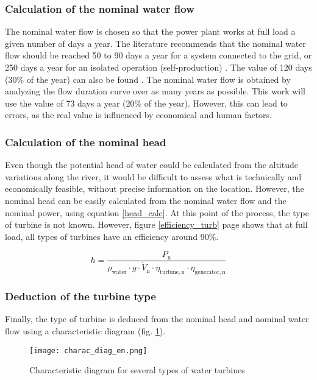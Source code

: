\subsubsection{Calculation of the nominal water flow}
\label{sub:extrapol_dV_n}

The nominal water flow is chosen so that the power plant works at full load a given number of days a year. The literature recommends that the nominal water flow should be reached 50 to 90 days a year for a system connected to the grid, or 250 days a year for an isolated operation (self-production) \cite{pacer}\cite{cetmef}. The value of 120 days (30\% of the year) can also be found \cite{cetmef}. The nominal water flow is obtained by analyzing the flow duration curve over as many years as possible. This work will use the value of 73 days a year (20\% of the year). However, this can lead to errors, as the real value is influenced by economical and human factors.

\subsubsection{Calculation of the nominal head}
\label{sub:extrapol_h_n}

Even though the potential head of water could be calculated from the altitude variations along the river, it would be difficult to assess what is technically and economically feasible, without precise information on the location. However, the nominal head can be easily calculated from the nominal water flow and the nominal power, using equation \ref{head_calc}. At this point of the process, the type of turbine is not known. However, figure \ref{efficiency_turb} page \pageref{efficiency_turb} shows that at full load, all types of turbines have an efficiency around 90\%.

\begin{equation}
\label{head_calc} 
 h = \frac{P_\mathrm{n}}{\rho_\mathrm{water} \cdot g \cdot \dot{V}_\mathrm{n} \cdot \eta_\mathrm{turbine,n} \cdot \eta_\mathrm{generator,n}}
\end{equation}

\subsubsection{Deduction of the turbine type}
Finally, the type of turbine is deduced from the nominal head and nominal water flow using a characteristic diagram (fig. \ref{charac_diag}). 

\begin{figure}[H]
\centering
\texttt{[image: charac\_diag\_en.png]}
\caption[Characteristic diagram for several types of water turbines]{Characteristic diagram for several types of water turbines \cite{wiki_WK}}
\label{charac_diag}
\end{figure}


